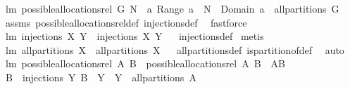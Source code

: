 \begin{isabellebody}
\isanewline
%
\endisadelimproof
\isanewline
{}\isamarkupfalse%
\ lm{}{}{\isacharcolon}\ {\isachardoublequoteopen}possible{\isacharunderscore}allocations{\isacharunderscore}rel\ G\ N\ {\isasymsubseteq}\ {\isacharbraceleft}a{\isachardot}\ Range\ a\ {\isasymsubseteq}\ N\ {\isacharampersand}\ Domain\ a\ {\isasymin}\ all{\isacharunderscore}partitions\ G{\isacharbraceright}{\isachardoublequoteclose}\isanewline
%
\isadelimproof
%
\endisadelimproof
%
\isatagproof
{}\isamarkupfalse%
\ assms\ possible{\isacharunderscore}allocations{\isacharunderscore}rel{\isacharunderscore}def\ injections{\isacharunderscore}def\ \isamarkupfalse%
\ fastforce%
\endisatagproof
{\isafoldproof}%
%
\isadelimproof
\isanewline
%
\endisadelimproof
\isanewline
{}\isamarkupfalse%
\ lm{}{}{\isacharcolon}\ {\isachardoublequoteopen}injections\ X\ Y\ {\isacharequal}\ injections{\isacharprime}\ X\ Y{\isachardoublequoteclose}%
\isadelimproof
\ %
\endisadelimproof
%
\isatagproof
{}\isamarkupfalse%
\ injections{\isacharunderscore}def\isanewline
{}\isamarkupfalse%
\ metis%
\endisatagproof
{\isafoldproof}%
%
\isadelimproof
%
\endisadelimproof
\isanewline
\isanewline
{}\isamarkupfalse%
\ lm{}{}{\isacharcolon}\ {\isachardoublequoteopen}all{\isacharunderscore}partitions\ X\ {\isacharequal}\ all{\isacharunderscore}partitions{\isacharprime}\ X{\isachardoublequoteclose}%
\isadelimproof
\ %
\endisadelimproof
%
\isatagproof
{}\isamarkupfalse%
\ all{\isacharunderscore}partitions{\isacharunderscore}def\ is{\isacharunderscore}partition{\isacharunderscore}of{\isacharunderscore}def\ \isanewline
{}\isamarkupfalse%
\ auto%
\endisatagproof
{\isafoldproof}%
%
\isadelimproof
%
\endisadelimproof
\isanewline
\isanewline
{}\isamarkupfalse%
\ lm{}{}{\isacharcolon}\ {\isachardoublequoteopen}possible{\isacharunderscore}allocations{\isacharunderscore}rel{\isacharprime}\ A\ B\ {\isacharequal}\ possible{\isacharunderscore}allocations{\isacharunderscore}rel\ A\ B{\isachardoublequoteclose}\ {\isacharparenleft}\ {\isachardoublequoteopen}{\isacharquery}A{\isacharequal}{\isacharquery}B{\isachardoublequoteclose}{\isacharparenright}\isanewline
%
\isadelimproof
%
\endisadelimproof
%
\isatagproof
{}\isamarkupfalse%
\ {\isacharminus}\isanewline
\ \ \isamarkupfalse%
\ {\isachardoublequoteopen}{\isacharquery}B{\isacharequal}{\isasymUnion}\ {\isacharbraceleft}\ injections\ Y\ B\ {\isacharbar}\ Y\ {\isachardot}\ Y\ {\isasymin}\ all{\isacharunderscore}partitions\ A\ {\isacharbraceright}{\isachardoublequoteclose}\isanewline

\end{isabellebody}
